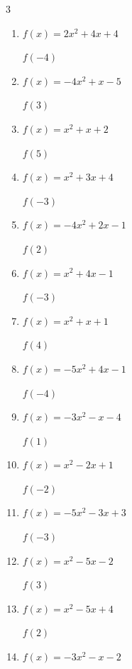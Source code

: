 \begin{multicols}{3}
\begin{enumerate}
$f(-1)$
        \phantom{$= -7$}

  \item $f(x)=2x^{2}+4x+4$

$f(-4)$
        \phantom{$= 20$}

  \item $f(x)=-4x^{2}+x-5$

$f(3)$
        \phantom{$= -38$}

  \item $f(x)=x^{2}+x+2$

$f(5)$
        \phantom{$= 32$}

  \item $f(x)=x^{2}+3x+4$

$f(-3)$
        \phantom{$= 4$}

  \item $f(x)=-4x^{2}+2x-1$

$f(2)$
        \phantom{$= -13$}

  \item $f(x)=x^{2}+4x-1$

$f(-3)$
        \phantom{$= -4$}

  \item $f(x)=x^{2}+x+1$

$f(4)$
        \phantom{$= 21$}

\columnbreak %

\resetques

  \item $f(x)=-5x^{2}+4x-1$

$f(-4)$
        \phantom{$= -97$}

  \item $f(x)=-3x^{2}-x-4$

$f(1)$
        \phantom{$= -8$}

  \item $f(x)=x^{2}-2x+1$

$f(-2)$
        \phantom{$= 9$}

  \item $f(x)=-5x^{2}-3x+3$

$f(-3)$
        \phantom{$= -33$}

  \item $f(x)=x^{2}-5x-2$

$f(3)$
        \phantom{$= -8$}

  \item $f(x)=x^{2}-5x+4$

$f(2)$
        \phantom{$= -2$}

  \item $f(x)=-3x^{2}-x-2$


\end{enumerate}
\end{multicols}

